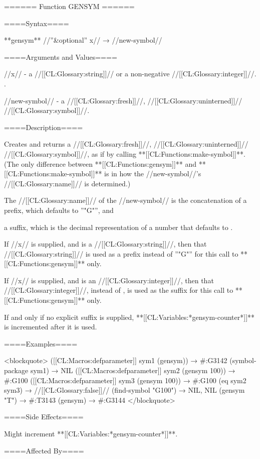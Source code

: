 ====== Function GENSYM ======

====Syntax====

**gensym** //''&optional'' x// → //new-symbol//

====Arguments and Values====

//x// - a //[[CL:Glossary:string]]// or a non-negative //[[CL:Glossary:integer]]//. \HairyDefault.

//new-symbol// - a //[[CL:Glossary:fresh]]//, //[[CL:Glossary:uninterned]]// //[[CL:Glossary:symbol]]//.

====Description====

Creates and returns a //[[CL:Glossary:fresh]]//, //[[CL:Glossary:uninterned]]// //[[CL:Glossary:symbol]]//, as if by calling **[[CL:Functions:make-symbol]]**. (The only difference between **[[CL:Functions:gensym]]** and **[[CL:Functions:make-symbol]]** is in how the //new-symbol//'s //[[CL:Glossary:name]]// is determined.)

The //[[CL:Glossary:name]]// of the //new-symbol// is the concatenation of a prefix, which defaults to ''"G"'', and

a suffix, which is the decimal representation of a number that defaults to .

If //x// is supplied, and is a //[[CL:Glossary:string]]//, then that //[[CL:Glossary:string]]// is used as a prefix instead of ''"G"'' for this call to **[[CL:Functions:gensym]]** only.

If //x// is supplied, and is an //[[CL:Glossary:integer]]//, then that //[[CL:Glossary:integer]]//, instead of , is used as the suffix for this call to **[[CL:Functions:gensym]]** only.

If and only if no explicit suffix is supplied, **[[CL:Variables:*gensym-counter*]]** is incremented after it is used.

====Examples====

<blockquote> ([[CL:Macros:defparameter]] sym1 (gensym)) → #:G3142 (symbol-package sym1) → NIL ([[CL:Macros:defparameter]] sym2 (gensym 100)) → #:G100 ([[CL:Macros:defparameter]] sym3 (gensym 100)) → #:G100 (eq sym2 sym3) → //[[CL:Glossary:false]]// (find-symbol "G100") → NIL, NIL (gensym "T") → #:T3143 (gensym) → #:G3144 </blockquote>

====Side Effects====

Might increment **[[CL:Variables:*gensym-counter*]]**.

====Affected By====

